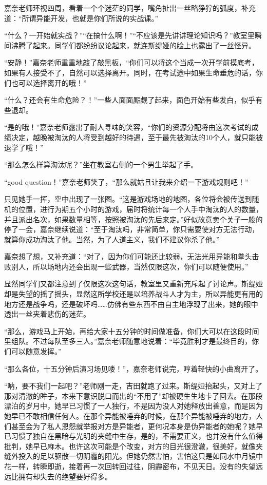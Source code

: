 \documentclass[a5paper, punct=kaiming, fontset=none]{ctexart}
\begin{document}
嘉奈老师环视四周，看着一个个迷茫的同学，嘴角扯出一丝略狰狞的弧度，补充道：“所谓异能开发，也就是你们所说的实战课。”

“什么？一开始就实战？”“在搞什么啊！”“不应该是先讲讲理论知识吗？”教室里瞬间沸腾了起来。同学们都纷纷议论起来，就连斯缇娅的脸上也露出了一丝怪异。

“安静！”嘉奈老师重重地敲了敲黑板，“你们可以将这个当成一次开学前摸底考，如果有人接受不了，自然可以选择离开。同时，在考试途中如果生命垂危的话，你们也可以选择离开的哦！”

“什么？还会有生命危险？！”一些人面面厮觑了起来，面色开始有些发白，似乎有些退却。

“是的哦！”嘉奈老师露出了耐人寻味的笑容，“你们的资源分配将由这次考试的成绩决定，越晚被淘汰的人将受到越好的待遇，至于最先被淘汰的10个人，就只能被退学了哦！”

“那么怎么样算淘汰呢？”坐在教室右侧的一个男生举起了手。

“good question！”嘉奈老师笑了，“那么就姑且让我来介绍一下游戏规则吧！”

只见她手一挥，空中出现了一张图。“这是游戏场地的地图，各位将会被传送到随机的位置，进行为期五个小时的游戏，届时将统计每一个人手中淘汰的人的数量，并且派出名次，如果数量相等，按照被淘汰的先后来定。”好似故意卖个关子一般的停了一会，嘉奈继续说道：“至于淘汰吗，非常简单，你只需要使对方无法行动，就算你成功淘汰了他。当然，为了人道主义，我们不建议你杀了他。”

嘉奈想了想，又补充道：“对了，因为你们可能还比较弱，无法光用异能和拳头击败别人，所以场地内还会出现一些武器，当然仅限这次，你们可以随便使用。”

显然同学们又都注意到了仅限这次这句话，教室里又重新充斥起了讨论声。斯缇娅却是失望的摇了摇头，显然这所学校还是以培养战斗人才为主，所以异能更有用的地方还是战争吗，还是破坏吗……仿佛有些东西不由自主地浮现了出来，她的眼中透出一丝夹着悲伤的迷茫。

“那么，游戏马上开始，再给大家十五分钟的时间做准备，你们大可以在这段时间里组队。不过每队至多三人。”嘉奈老师随意地说着：“毕竟胜利才是最终目的，你们可以随意发挥。”

“那么各位，十五分钟后演习场见喽！”，嘉奈老师说完，哼着轻快的小曲离开了。

“呐，要不我们一起吧？”老师刚一走，吉田就跑了过来。斯缇娅抬起头，又对上了那对清澈的眸子，本来下意识脱口而出的“不用了”却被硬生生地卡了回去。在那段漂泊的岁月中，她早已习惯了一人独行，不是因为没人对她释放出善意，而是因为她早已不敢相信任何人。在那个异能被唾弃的时候，在那个异能被唾弃的地方，人们甚至会为了私人恩怨就举报对方是异能者，更何况本身是伪异能者的她呢？她早已习惯了独自在黑暗与光明的夹缝中生存，是的，不需要正义，也并没有什么值得批判，她早已麻木。也许这次可能是个改变，对方的目光很澄澈，很美好，就像夹缝外投入的足以驱散一切阴霾的阳光。但她仍然害怕，害怕这只是如同水中月镜中花一样，转瞬即逝，接着再一次回转回过往，阴霾密布，不见天日。没有的失望远远比拥有却失去的绝望要好得多。
\end{document}
